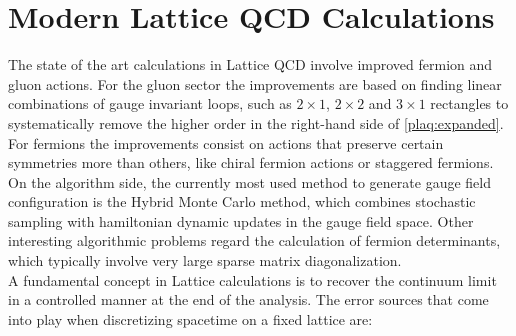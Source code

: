 \section{Modern Lattice QCD Calculations}
The state of the art calculations in Lattice QCD involve improved fermion and gluon actions. For the gluon sector the improvements are based on finding linear combinations of gauge invariant loops, such as $2\times 1$, $2\times 2$ and $3\times 1$ rectangles to systematically remove the higher order in the right-hand side of \cref{plaq:expanded}. For fermions the improvements consist on actions that preserve certain symmetries more than others, like chiral fermion actions or staggered fermions.\\
On the algorithm side, the currently most used method to generate gauge field configuration is the Hybrid Monte Carlo method, which combines stochastic sampling with hamiltonian dynamic updates in the  gauge field space. Other interesting algorithmic problems regard the calculation of fermion determinants, which typically involve very large sparse matrix diagonalization.\\
A fundamental concept in Lattice calculations is to recover the continuum limit in a controlled manner at the end of the analysis. The error sources that come into play when discretizing spacetime on a fixed lattice are:
